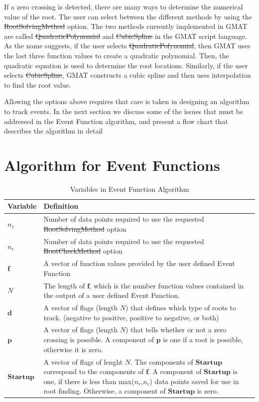 If a zero crossing is detected, there are many ways to determine the
numerical value of the root.  The user can select between the
different methods by using the \st{RootSolvingMethod} option. The
two methods currently implemented in GMAT are called
\st{QuadraticPolynomial} and \st{CubicSpline} in the GMAT script
language.  As the name suggests, if the user selects
\st{QuadraticPolynomial}, then GMAT uses the last three function
values to create a quadratic polynomial.  Then, the quadratic
equation is used to determine the root locations. Similarly, if the
user selects \st{CubicSpline}, GMAT constructs a cubic spline and
then uses interpolation to find the root value.

Allowing the options above requires that care is taken in designing
an algorithm to track events.  In the next section we discuss some
of the issues that must be addressed in the Event Function
algorithm, and present a flow chart that describes the algorithm in
detail

\section{Algorithm for Event Functions }


\begin{table}[htb]
\caption{ Variables in Event Function Algorithm}
\begin{tabular}{p{.5 in} p{2.5 in}}
   \hline
   Variable & Definition\\
   \hline \hline
    $n_r$     & Number of data points required to use the requested \st{RootSolvingMethod} option \\
    $n_c$     & Number of data points required to use the requested \st{RootCheckMethod} option\\
    $\mathbf{f}$  & A vector of function values provided by the user
    defined Event Function\\
    $N$           &  The length of $\mathbf{f}$, which is the number
    function values contained in  the output of a user defined Event
    Function.\\
    $\mathbf{d}$   &  A vector of flags (length $N$) that defines which
    type of roots to track.  (negative to positive, positive to
    negative, or both)\\
    $\mathbf{p}$   &  A vector of flags (length $N$) that tells whether or not a
    zero crossing is possible.  A component of $\mathbf{p}$ is one
    if a root is possible, otherwise it is zero.\\
    $\mathbf{Startup}$ & A vector of flags of lenght $N$.  The components of $\mathbf{Startup}$ correspond to the components of $\mathbf{f}$.
                        A component of $\mathbf{Startup}$ is one, if there is
                       less than max($n_r$,$n_c$) data points saved for use in root finding.
                        Otherwise, a component of $\mathbf{Startup}$ is zero.\\
   \hline
 \end{tabular}
 \label{Table:VariablesinEventFunctionChart}
\end{table}



